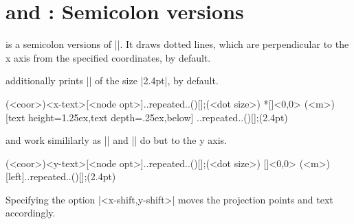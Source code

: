 \section{\protect\cmd{\tzprojsx(*)} and \protect\cmd{\tzprojsy(*)}: Semicolon versions}
\label{s:tzprojsx}

\icmd{\tzprojsx} is a semicolon versions of |\tzprojx|. It draws dotted lines, which are perpendicular to the x axis from the specified coordinates, by default.

\icmd{\tzprojsx*} additionally prints |\tzdots*| of the size |2.4pt|, by default.


\begin{tzdef}
            (<coor>){<x-text>}[<node opt>]..repeated..(){}[];(<dot size>)
 *[]<0,0> (<m>){}[text height=1.25ex,text depth=.25ex,below]
          ..repeated..(){}[];(2.4pt)
\end{tzdef}


\icmd{\tzprojsy} and \icmd{\tzprojsy*} work simililarly as |\tzprojsx| and |\tzprojsx*| do but to the y axis.

\begin{tzdef}
          (<coor>){<y-text>}[<node opt>]..repeated..(){}[];(<dot size>)
  []<0,0> (<m>){}[left]..repeated..(){}[];(2.4pt)
\end{tzdef}


\begin{tzcode}{.3}
\end{tzcode}

Specifying the option |<x-shift,y-shift>| moves the projection points and text accordingly.

\begin{tzcode}{.3}
\end{tzcode}



